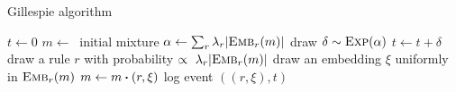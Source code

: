 \begin{algorithm}
\caption{Gillespie algorithm}\label{alg:gillespie}
\begin{spacing}{1.2}
\begin{algorithmic}
\vspace{0.2cm}
  \STATE $t \gets 0$
  \STATE $m \gets\ $ initial mixture
  \vspace{0.1cm}
      \vspace{0.1cm}
      \STATE $\alpha \gets \sum_r {\lambda_r |{\textsc{Emb}}_{r}(m)|}$
      \vspace{0.1cm}
      \STATE draw $\delta \sim \textsc{Exp}(\alpha) $
      \STATE $t \gets t + \delta$
      \STATE draw a rule $r$ with probability
      $\propto \ \lambda_r |{\textsc{Emb}}_{r}(m)|$
      \STATE draw an embedding $\xi$ uniformly in ${\textsc{Emb}}_{r}(m)$
      \STATE $m \gets \UPDATE{m}{(r, \xi)}$
      \STATE log event $((r, \xi), t)$
  \ENDWHILE
\vspace{0.1cm}
\end{algorithmic}
\end{spacing}
\end{algorithm}